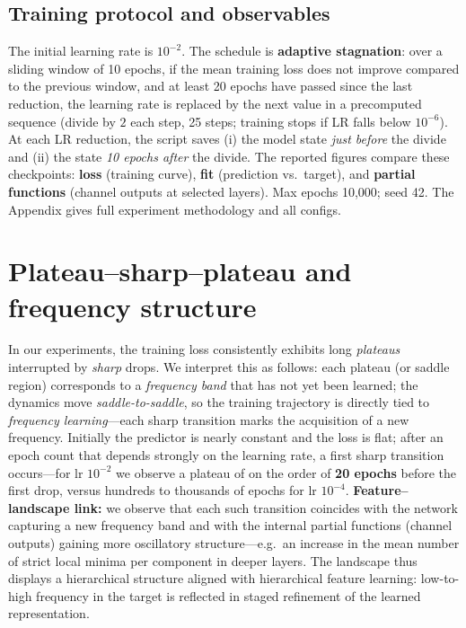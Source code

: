 \documentclass{article}
\begin{document}
\subsection{Training protocol and observables}
The initial learning rate is $10^{-2}$. The schedule is \textbf{adaptive stagnation}: over a sliding window of 10 epochs, if the mean training loss does not improve compared to the previous window, and at least 20 epochs have passed since the last reduction, the learning rate is replaced by the next value in a precomputed sequence (divide by $2$ each step, 25 steps; training stops if LR falls below $10^{-6}$). At each LR reduction, the script saves (i) the model state \emph{just before} the divide and (ii) the state \emph{10 epochs after} the divide. The reported figures compare these checkpoints: \textbf{loss} (training curve), \textbf{fit} (prediction vs.\ target), and \textbf{partial functions} (channel outputs at selected layers). Max epochs 10,000; seed 42. The Appendix gives full experiment methodology and all configs.

\section{Plateau--sharp--plateau and frequency structure}
\label{sec:plateau}

In our experiments, the training loss consistently exhibits long \emph{plateaus} interrupted by \emph{sharp} drops. We interpret this as follows: each plateau (or saddle region) corresponds to a \emph{frequency band} that has not yet been learned; the dynamics move \emph{saddle-to-saddle}, so the training trajectory is directly tied to \emph{frequency learning}---each sharp transition marks the acquisition of a new frequency. Initially the predictor is nearly constant and the loss is flat; after an epoch count that depends strongly on the learning rate, a first sharp transition occurs---for lr $10^{-2}$ we observe a plateau of on the order of \textbf{20 epochs} before the first drop, versus hundreds to thousands of epochs for lr $10^{-4}$. \textbf{Feature--landscape link:} we observe that each such transition coincides with the network capturing a new frequency band and with the internal partial functions (channel outputs) gaining more oscillatory structure---e.g.\ an increase in the mean number of strict local minima per component in deeper layers. The landscape thus displays a hierarchical structure aligned with hierarchical feature learning: low-to-high frequency in the target is reflected in staged refinement of the learned representation.
\end{document}
